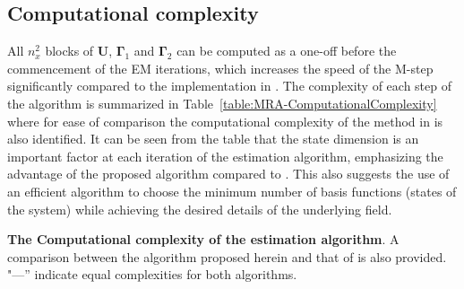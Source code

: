 \documentclass[review,authoryear,3p]{elsarticle}
\begin{document}
\subsection{Computational complexity} 
All $n_x^2$ blocks of $\mathbf U$, $\boldsymbol\Gamma_1$ and $\boldsymbol\Gamma_2$  can be computed as a one-off before the commencement of the EM iterations, which increases the speed of the M-step significantly compared to the implementation in \citet{Dewar2009}. The complexity of each step of the algorithm is summarized in Table~\ref{table:MRA-ComputationalComplexity} where for ease of comparison the computational complexity of the method in \citet{Dewar2009} is also identified. It can be seen from the table that the state dimension is an important factor at each iteration of the estimation algorithm, emphasizing the advantage of the proposed algorithm compared to \citet{Dewar2009}. This also suggests the use of an efficient algorithm to choose the minimum number of basis functions (states of the system) while achieving the desired details of the underlying field.  
\begin {table}
\begin{center}
 \caption {{\bf The Computational complexity of the estimation algorithm}. A comparison between the algorithm proposed herein and that of \citet{Dewar2009} is also provided. "\----'' indicate equal complexities for both algorithms.} 
\label{table:MRA-ComputationalComplexity}
\end{center}
\end {table} 
\end{document}
